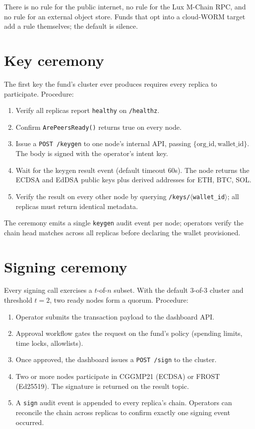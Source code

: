 \documentclass[11pt,a4paper]{article}
\begin{document}
There is no rule for the public internet, no rule for the Lux M-Chain
RPC, and no rule for an external object store. Funds that opt into a
cloud-WORM target add a rule themselves; the default is silence.

\section{Key ceremony}

The first key the fund's cluster ever produces requires every replica
to participate. Procedure:

\begin{enumerate}[label=\arabic*.]
  \item Verify all replicas report \texttt{healthy} on
        \texttt{/healthz}.
  \item Confirm \texttt{ArePeersReady()} returns true on every node.
  \item Issue a \texttt{POST /keygen} to one node's internal API,
        passing $\{\text{org\_id}, \text{wallet\_id}\}$. The body is
        signed with the operator's intent key.
  \item Wait for the keygen result event (default timeout 60s). The
        node returns the ECDSA and EdDSA public keys plus derived
        addresses for ETH, BTC, SOL.
  \item Verify the result on every other node by querying
        \texttt{/keys/$\langle$wallet\_id$\rangle$}; all replicas must
        return identical metadata.
\end{enumerate}

The ceremony emits a single \texttt{keygen} audit event per node;
operators verify the chain head matches across all replicas before
declaring the wallet provisioned.

\section{Signing ceremony}

Every signing call exercises a $t$-of-$n$ subset. With the default
3-of-3 cluster and threshold $t=2$, two ready nodes form a quorum.
Procedure:

\begin{enumerate}[label=\arabic*.]
  \item Operator submits the transaction payload to the dashboard API.
  \item Approval workflow gates the request on the fund's policy
        (spending limits, time locks, allowlists).
  \item Once approved, the dashboard issues a \texttt{POST /sign} to
        the cluster.
  \item Two or more nodes participate in CGGMP21 (ECDSA) or FROST
        (Ed25519). The signature is returned on the result topic.
  \item A \texttt{sign} audit event is appended to every replica's
        chain. Operators can reconcile the chain across replicas to
        confirm exactly one signing event occurred.
\end{enumerate}
\end{document}
